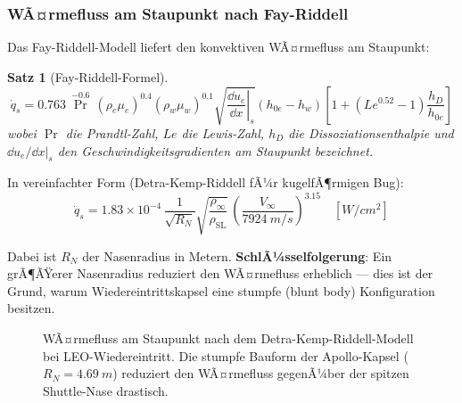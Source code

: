 ﻿\documentclass[12pt,a4paper]{article}
\newtheorem{satz}{Satz}[section]
\begin{document}
\subsubsection{WÃ¤rmefluss am Staupunkt nach Fay-Riddell}

Das Fay-Riddell-Modell liefert den konvektiven WÃ¤rmefluss am Staupunkt:

\begin{satz}[Fay-Riddell-Formel]
\[
  \dot{q}_s = 0.763\,\Pr^{-0.6}\,
    \left(\rho_e \mu_e\right)^{0.4}
    \left(\rho_w \mu_w\right)^{0.1}
    \sqrt{\left.\frac{\dd u_e}{\dd x}\right|_s}
    \left(h_{0e} - h_w\right)
    \left[1 + (Le^{0.52}-1)\frac{h_D}{h_{0e}}\right]
\]
wobei $\Pr$ die Prandtl-Zahl, $Le$ die Lewis-Zahl, $h_D$ die
Dissoziationsenthalpie und $\dd u_e/\dd x|_s$ den Geschwindigkeitsgradienten
am Staupunkt bezeichnet.
\end{satz}

In vereinfachter Form (Detra-Kemp-Riddell fÃ¼r kugelfÃ¶rmigen Bug):
\[
  \dot{q}_s = 1.83\times10^{-4}\,\frac{1}{\sqrt{R_N}}
    \sqrt{\frac{\rho_\infty}{\rho_{\mathrm{SL}}}}\,
    \left(\frac{V_\infty}{\SI{7924}{m/s}}\right)^{3.15}
    \quad [\si{W/cm^2}]
\]

Dabei ist $R_N$ der Nasenradius in Metern. \textbf{SchlÃ¼sselfolgerung}: Ein
grÃ¶ÃŸerer Nasenradius reduziert den WÃ¤rmefluss erheblich --- dies ist der Grund,
warum Wiedereintrittskapsel eine stumpfe (blunt body) Konfiguration besitzen.

\begin{figure}[H]
\centering
{}
\caption{WÃ¤rmefluss am Staupunkt nach dem Detra-Kemp-Riddell-Modell bei LEO-Wiedereintritt.
Die stumpfe Bauform der Apollo-Kapsel ($R_N = \SI{4.69}{m}$) reduziert den WÃ¤rmefluss
gegenÃ¼ber der spitzen Shuttle-Nase drastisch.}
\label{fig:waermefluss}
\end{figure}
\end{document}
